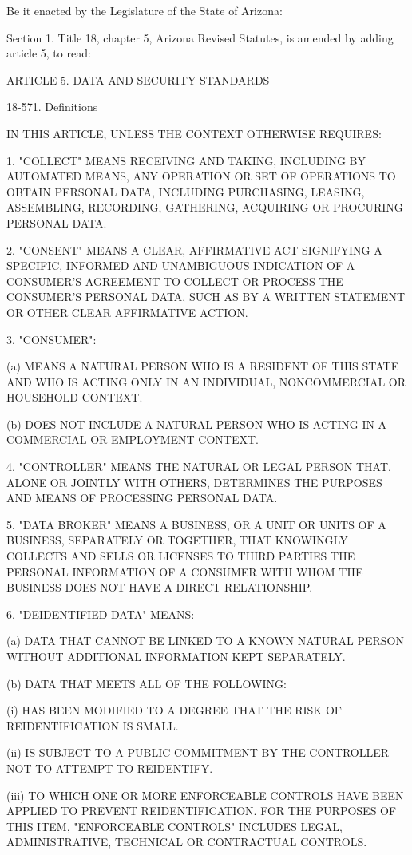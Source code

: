 Be it enacted by the Legislature of the State of Arizona:

Section 1. Title 18, chapter 5, Arizona Revised Statutes, is amended by adding article 5, to read:

ARTICLE 5. DATA AND SECURITY STANDARDS

18-571. Definitions

IN THIS ARTICLE, UNLESS THE CONTEXT OTHERWISE REQUIRES:

1. "COLLECT" MEANS RECEIVING AND TAKING, INCLUDING BY AUTOMATED MEANS, ANY OPERATION OR SET OF OPERATIONS TO OBTAIN PERSONAL DATA, INCLUDING PURCHASING, LEASING, ASSEMBLING, RECORDING, GATHERING, ACQUIRING OR PROCURING PERSONAL DATA.

2. "CONSENT" MEANS A CLEAR, AFFIRMATIVE ACT SIGNIFYING A SPECIFIC, INFORMED AND UNAMBIGUOUS INDICATION OF A CONSUMER'S AGREEMENT TO COLLECT OR PROCESS THE CONSUMER'S PERSONAL DATA, SUCH AS BY A WRITTEN STATEMENT OR OTHER CLEAR AFFIRMATIVE ACTION.

3. "CONSUMER":

(a) MEANS A NATURAL PERSON WHO IS A RESIDENT OF THIS STATE AND WHO IS ACTING ONLY IN AN INDIVIDUAL, NONCOMMERCIAL OR HOUSEHOLD CONTEXT.

(b) DOES NOT INCLUDE A NATURAL PERSON WHO IS ACTING IN A COMMERCIAL OR EMPLOYMENT CONTEXT.

4. "CONTROLLER" MEANS THE NATURAL OR LEGAL PERSON THAT, ALONE OR JOINTLY WITH OTHERS, DETERMINES THE PURPOSES AND MEANS OF PROCESSING PERSONAL DATA.

5. "DATA BROKER" MEANS A BUSINESS, OR A UNIT OR UNITS OF A BUSINESS, SEPARATELY OR TOGETHER, THAT KNOWINGLY COLLECTS AND SELLS OR LICENSES TO THIRD PARTIES THE PERSONAL INFORMATION OF A CONSUMER WITH WHOM THE BUSINESS DOES NOT HAVE A DIRECT RELATIONSHIP.

6. "DEIDENTIFIED DATA" MEANS:

(a) DATA THAT CANNOT BE LINKED TO A KNOWN NATURAL PERSON WITHOUT ADDITIONAL INFORMATION KEPT SEPARATELY.

(b) DATA THAT MEETS ALL OF THE FOLLOWING:

(i) HAS BEEN MODIFIED TO A DEGREE THAT THE RISK OF REIDENTIFICATION IS SMALL.

(ii) IS SUBJECT TO A PUBLIC COMMITMENT BY THE CONTROLLER NOT TO ATTEMPT TO REIDENTIFY.

(iii) TO WHICH ONE OR MORE ENFORCEABLE CONTROLS HAVE BEEN APPLIED TO PREVENT REIDENTIFICATION. FOR THE PURPOSES OF THIS ITEM, "ENFORCEABLE CONTROLS" INCLUDES LEGAL, ADMINISTRATIVE, TECHNICAL OR CONTRACTUAL CONTROLS.

